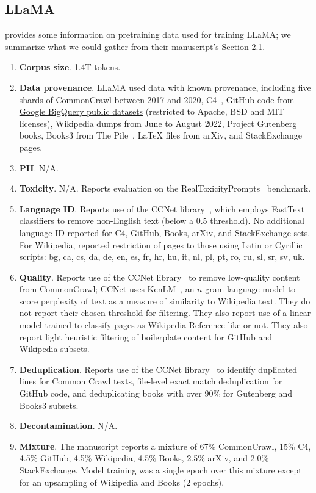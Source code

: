\documentclass{article}
\begin{document}
\subsection{LLaMA~\citep{Touvron2023LLaMAOA}}\label{appendix:llm:llama} 

\citet{Touvron2023LLaMAOA} provides some information on pretraining data used for training LLaMA; we summarize what we could gather from their manuscript's Section 2.1.

\begin{enumerate}
    \item \textbf{Corpus size}. 1.4T tokens. 
    \item \textbf{Data provenance}. LLaMA used data with known provenance, including five shards of CommonCrawl between 2017 and 2020, C4~\citep{raffel2020exploring}, GitHub code from \href{https://cloud.google.com/bigquery/public-data/}{Google BigQuery public datasets} (restricted to Apache, BSD and MIT licenses), Wikipedia dumps from June to August 2022, Project Gutenberg books, Books3 from The Pile~\citep{Gao2020ThePA}, LaTeX files from arXiv, and StackExchange pages. 
    \item \textbf{PII}. N/A.
    \item \textbf{Toxicity}. N/A. Reports evaluation on the RealToxicityPrompts~\citep{gehman-etal-2020-realtoxicityprompts} benchmark.
    \item \textbf{Language ID}. Reports use of the CCNet library~\citep{wenzek-etal-2020-ccnet}, which employs FastText~\citep{joulin2016fasttext} classifiers to remove non-English text (below a 0.5 threshold). No additional language ID reported for C4, GitHub, Books, arXiv, and StackExchange sets. For Wikipedia, reported restriction of pages to those using Latin or Cyrillic scripts: bg, ca, cs, da, de, en, es, fr, hr, hu, it, nl, pl, pt, ro, ru, sl, sr, sv, uk.
    \item \textbf{Quality}. Reports use of the CCNet library~\citep{wenzek-etal-2020-ccnet} to remove low-quality content from CommonCrawl; CCNet uses KenLM~\citep{heafield-2011-kenlm}, an $n$-gram language model to score perplexity of text as a measure of similarity to Wikipedia text. They do not report their chosen threshold for filtering. They also report use of a linear model trained to classify pages as Wikipedia Reference-like or not. They also report light heuristic filtering of boilerplate content for GitHub and Wikipedia subsets.
    \item \textbf{Deduplication}. Reports use of the CCNet library~\citep{wenzek-etal-2020-ccnet} to identify duplicated lines for Common Crawl texts, file-level exact match deduplication for GitHub code, and deduplicating books with over 90\% for Gutenberg and Books3 subsets. 
    \item \textbf{Decontamination}. N/A.
    \item \textbf{Mixture}. The manuscript reports a mixture of 67\% CommonCrawl, 15\% C4, 4.5\% GitHub, 4.5\% Wikipedia, 4.5\% Books, 2.5\% arXiv, and 2.0\% StackExchange. Model training was a single epoch over this mixture except for an upsampling of Wikipedia and Books (2 epochs).
\end{enumerate}
\end{document}

